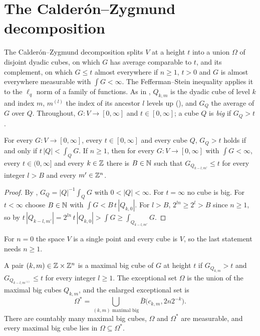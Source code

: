 \section{The Calder\'on--Zygmund decomposition}

The Calder\'on--Zygmund decomposition splits $V$ at a height $t$ into a union $\Omega$ of disjoint
dyadic cubes, on which $G$ has average comparable to $t$, and its complement, on which $G \leq t$
almost everywhere if $n \geq 1$, $t > 0$ and $G$ is almost everywhere measurable with
$\int G < \infty$. The Fefferman--Stein inequality applies it to the $\ell_q$ norm of a family
of functions. As in , $Q_{k,m}$ is the dyadic cube of level $k$ and
index $m$, $m^{(l)}$ the index of its ancestor $l$ levels up (),
and $G_Q$ the average of $G$ over $Q$. Throughout, $G : V \to [0, \infty]$ and
$t \in [0, \infty]$; a cube $Q$ is \emph{big} if $G_Q > t$.

\begin{lemma}
\label{lem:coarse-cubes-not-big}
\leanok
{}
For every $G : V \to [0, \infty]$, every $t \in [0, \infty]$ and every cube $Q$, $G_Q > t$ holds
if and only if $t \, |Q| < \int_Q G$. If $n \geq 1$, then for every $G : V \to [0, \infty]$ with
$\int G < \infty$, every $t \in (0, \infty]$ and every $k \in \mathbb{Z}$ there is $B \in \mathbb{N}$ such that
$G_{Q_{k-l,m'}} \leq t$ for every integer $l > B$ and every $m' \in \mathbb{Z}^n$.
\end{lemma}

\begin{proof}
\leanok
By , $G_Q = |Q|^{-1} \int_Q G$ with $0 < |Q| < \infty$. For $t = \infty$
no cube is big. For $t < \infty$ choose $B \in \mathbb{N}$ with $\int G < B \, t \, |Q_{k,0}|$. For
$l > B$, $2^{ln} \geq 2^l > B$ since $n \geq 1$, so by 
$t \, |Q_{k-l,m'}| = 2^{ln} \, t \, |Q_{k,0}| > \int G \geq \int_{Q_{k-l,m'}} G$.
\end{proof}

For $n = 0$ the space $V$ is a single point and every cube is $V$, so the last statement needs
$n \geq 1$.

\begin{definition}
\label{def:calderon-zygmund-cubes}
\leanok
{}
A pair $(k, m) \in \mathbb{Z} \times \mathbb{Z}^n$ is a maximal big cube of $G$ at height $t$ if
$G_{Q_{k,m}} > t$ and $G_{Q_{k-l,m^{(l)}}} \leq t$ for every integer $l \geq 1$. The exceptional
set $\Omega$ is the union of the maximal big cubes $Q_{k,m}$, and the enlarged exceptional set is
\[
  \Omega^* = \bigcup_{(k, m) \text{ maximal big}} \bar B\bigl(c_{k,m}, 2 n 2^{-k}\bigr) .
\]
There are countably many maximal big cubes, $\Omega$ and $\Omega^*$ are measurable, and every
maximal big cube lies in $\Omega \subseteq \Omega^*$.
\end{definition}

